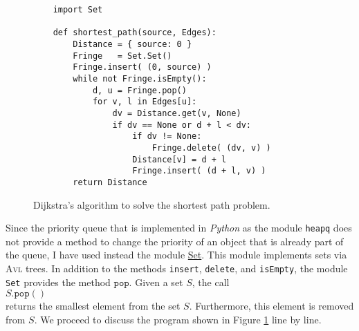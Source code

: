 \begin{figure}[!ht]
\centering
\begin{verbatim}
    import Set

    def shortest_path(source, Edges):
        Distance = { source: 0 }
        Fringe   = Set.Set()
        Fringe.insert( (0, source) )
        while not Fringe.isEmpty():
            d, u = Fringe.pop()
            for v, l in Edges[u]:
                dv = Distance.get(v, None)
                if dv == None or d + l < dv:
                    if dv != None:
                        Fringe.delete( (dv, v) )
                    Distance[v] = d + l
                    Fringe.insert( (d + l, v) )
        return Distance
\end{verbatim}
\vspace*{-0.3cm}
\caption{Dijkstra's algorithm to solve the shortest path problem.}
\label{fig:Dijkstra.ipynb}
\end{figure}
Since the priority queue that is implemented in \textsl{Python} as the module \texttt{heapq} does not provide a
method to change the priority of an object that is already part of the queue, I have used instead the module
\href{https://github.com/karlstroetmann/Algorithms/blob/master/Python/Set.py}{Set}.  This
module implements sets via \textsc{Avl} trees.  In addition to the methods \texttt{insert}, \texttt{delete},
and \texttt{isEmpty}, the module \texttt{Set} provides the method $\texttt{pop}$.  Given a set $S$, the call
\\[0.2cm]
\hspace*{1.3cm}
$S.\texttt{pop}()$
\\[0.2cm]
returns the smallest element from the set $S$.  Furthermore, this element is removed from $S$.
We proceed to discuss the program shown in Figure \ref{fig:Dijkstra.ipynb} line by line.
